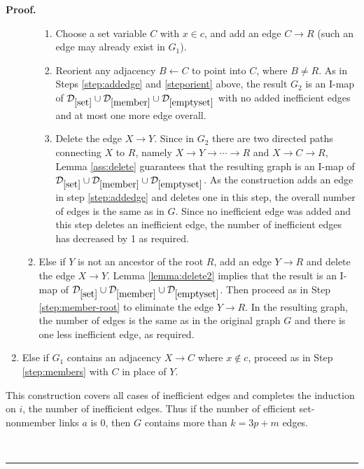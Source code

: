 \documentclass{elsarticle}%
\renewenvironment{proof}[1][Proof]{\noindent\textbf{#1.} }{\ \rule{0.5em}{0.5em}}
\newcommand{\B}{B}
\newcommand{\R}{R}
\newcommand{\X}{X}
\newcommand{\Y}{Y}
\newcommand{\C}{C}
\newcommand{\G}{G}
\newcommand{\D}{\mathcal{D}}
\renewcommand{\c}{c}
\newcommand{\x}{x}
\begin{document}
\begin{proof}
\begin{enumerate}
\begin{enumerate}
\begin{enumerate}
\item Choose a set variable $\C$ with $\x \in \c$, and add an edge $\C \rightarrow \R$ (such an edge may already exist in $\G_1$).

 
\item Reorient any adjacency $\B \leftarrow \C$ to point into $\C$, where $\B \neq \R$. As in Steps \ref{step:addedge} and \ref{steporient} above, the result $\G_2$ is an I-map of $\D_{\ref{set}}\cup \D_{\ref{member}}\cup
\D_{\ref{emptyset}}$ with no added inefficient edges and at most one more edge overall.
\item Delete the edge $\X \rightarrow \Y$. Since in $\G_2$ there are two directed paths connecting $\X$ to $\R$, namely $\X \rightarrow  \Y \rightarrow \cdots \rightarrow \R$ and $\X \rightarrow \C \rightarrow \R$, Lemma \ref{ass:delete} guarantees that the resulting graph is an I-map of $\D_{\ref{set}}\cup \D_{\ref{member}}\cup
\D_{\ref{emptyset}}$. As the construction adds an edge in step \ref{step:addedge} and deletes one in this step, the overall number of edges is the same as in $\G$. Since no inefficient edge was added and this step deletes an inefficient edge, the number of inefficient edges has decreased by 1 as required.
\end{enumerate}
\item Else if $\Y$ is not an ancestor of the root $\R$, add an edge $\Y \rightarrow \R$ and delete the edge $\X \rightarrow \Y$. Lemma \ref{lemma:delete2} implies that the result is an I-map of $\D_{\ref{set}}\cup \D_{\ref{member}}\cup
\D_{\ref{emptyset}}$. Then proceed as in Step \ref{step:member-root} to eliminate the edge $\Y \rightarrow \R$.
In the resulting graph, the number of edges is the same as in the original graph $\G$ and there is one less inefficient edge, as required.
\end{enumerate}
\item Else if $\G_{1}$ contains an adjacency $\X \rightarrow \C$ where $\x \not\in \c$, proceed as in Step \ref{step:members} with $\C$ in place of $\Y$.
\end{enumerate}
%
This construction covers all cases of inefficient edges and completes the induction on $i$, the number of inefficient edges. Thus if the number of efficient set-nonmember links $a$ is 0, then $\G$ contains more than $k = 3p+m$ edges. 


\end{proof}
\end{document}
